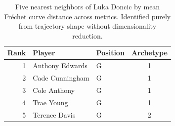 \begin{table}[htbp]
  \centering\small
  \begin{tabular}{rllc}
    \toprule
    Rank & Player & Position & Archetype \\
    \midrule
    1 & Anthony Edwards & G & 1 \\
    2 & Cade Cunningham & G & 1 \\
    3 & Cole Anthony & G & 1 \\
    4 & Trae Young & G & 1 \\
    5 & Terence Davis & G & 2 \\
    \bottomrule
  \end{tabular}
  \caption{Five nearest neighbors of Luka Doncic by mean Fr\'{e}chet curve distance across metrics. Identified purely from trajectory shape without dimensionality reduction.}
  \label{tab:Luka_Doncic_frechet_curve_neighbors}
\end{table}

